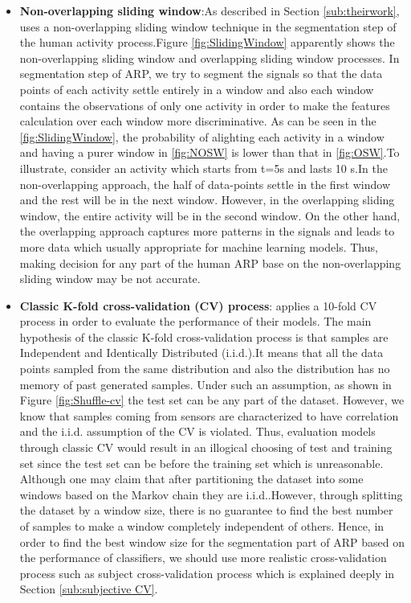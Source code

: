 \begin{itemize}
\item \textbf{Non-overlapping sliding window}:As described in Section \ref{sub:theirwork}, \cite{banos2014window} uses a non-overlapping sliding window technique in the segmentation step of the human activity process.Figure \ref{fig:SlidingWindow} apparently shows the non-overlapping sliding window and overlapping sliding window processes. In segmentation step of ARP, we try to segment the signals so that the data points of each activity settle entirely in a window and also each window contains the observations of only one activity in order to make the features calculation over each window more discriminative.
As can be seen in the \ref{fig:SlidingWindow}, the probability of alighting each activity in a window and having a purer window in \ref{fig:NOSW} is lower than that in \ref{fig:OSW}.To illustrate, consider an activity which starts from t=5s and lasts 10 s.In the non-overlapping approach, the half of data-points settle in the first window and the rest will be in the next window. However, in the overlapping sliding window, the entire activity will be in the second window. On the other hand, the overlapping approach captures more patterns in the signals and leads to more data which usually appropriate for machine learning models. Thus, making decision for any part of the human ARP base on the non-overlapping sliding window may be not accurate.\newline


\item \textbf{Classic K-fold cross-validation (CV) process}:
\cite{banos2014window} applies a 10-fold CV process in order to evaluate the performance of their models.
The main hypothesis of the classic K-fold cross-validation process is that samples are Independent and Identically Distributed (i.i.d.).It means that all the data points sampled from the same distribution and also the distribution has no memory of past generated samples. Under such an assumption, as shown in Figure \ref{fig:Shuffle-cv} the test set can be any part of the dataset. However, we know that samples coming from sensors are characterized to have correlation and the i.i.d. assumption of the CV is violated. Thus, evaluation models through classic CV would result in an illogical choosing of test and training set since the test set can be before the training set which is unreasonable. Although one may claim that after partitioning the dataset into some windows based on the Markov chain \cite{gilks1995markov} they are i.i.d..However, through splitting the dataset by a window size, there is no guarantee to find the best number of samples to make a window completely independent of others. Hence, in order to find the best window size for the segmentation part of ARP based on the performance of classifiers, we should use more realistic cross-validation process such as subject cross-validation process which is explained deeply in Section \ref{sub:subjective CV}.


\end{itemize}
